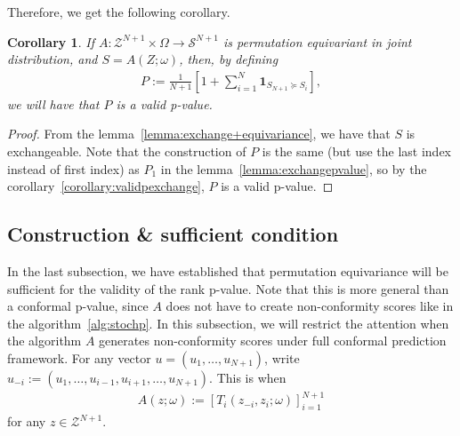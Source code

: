 \documentclass{article}
\newcommand{\cc}[1]{\left[ #1 \right]}
\newtheorem{corollary}{Corollary}
\begin{document}
        Therefore, we get the following corollary.
        \begin{corollary}
        \label{corollary:validpfromA}
            If $A: \mathcal{Z}^{N+1} \times \Omega \to \mathcal{S}^{N+1}$ is permutation equivariant in joint distribution, and $S = A(Z; \omega)$, then, by defining 
            \begin{align*}
                P := \frac{1}{N+1}\cc{1+\sum_{i=1}^N \mathbf{1}_{S_{N+1} \succcurlyeq S_i}},
            \end{align*}
            we will have that $P$ is a valid p-value.
        \end{corollary}
        \begin{proof}
            From the lemma~\ref{lemma:exchange+equivariance}, we have that $S$ is exchangeable. Note that the construction of $P$ is the same (but use the last index instead of first index) as $P_1$ in the lemma~\ref{lemma:exchangepvalue}, so by the corollary~\ref{corollary:validpexchange}, $P$ is a valid p-value.
        \end{proof}

    \subsection{Construction \& sufficient condition}

        In the last subsection, we have established that permutation equivariance will be sufficient for the validity of the rank p-value. Note that this is more general than a conformal p-value, since $A$ does not have to create non-conformity scores like in the algorithm~\ref{alg:stochp}. In this subsection, we will restrict the attention when the algorithm $A$ generates non-conformity scores under full conformal prediction framework. For any vector $u=(u_1,\ldots,u_{N+1})$, write
        $u_{-i}:=(u_1,\ldots,u_{i-1},u_{i+1},\ldots,u_{N+1})$.
        This is when 
        \begin{align*}
            A\left(z; \omega\right)
            :=
            \left[
                T_i\left(z_{-i}, z_i; \omega\right)
            \right]_{i=1}^{N+1}
        \end{align*}
        for any $z \in \mathcal{Z}^{N+1}$.
\end{document}

